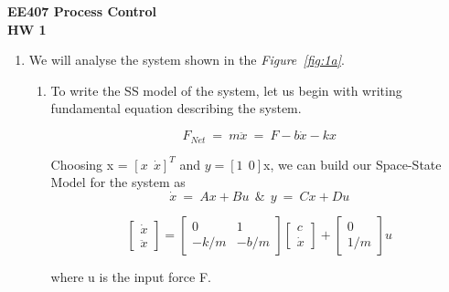 \documentclass[a4paper,12pt]{article}
\begin{document}
\begin{center}
	\textbf{\large EE407 Process Control \\[0.2cm] HW 1} \\
\end{center}

\begin{enumerate}
	\item We will analyse the system shown in the \textit{Figure~\ref{fig:1a}}. 

		\begin{enumerate}
			\item To write the SS model of the system, let us begin with writing fundamental equation describing the system.
			
			$$	F_{Net}~=~m\ddot{x}~=~F-b\dot{x}-kx	$$
			
			Choosing x = ${[x~~\dot{x}]}^T$ and $ y = [1~~0] $x, we can build our Space-State Model for the system as 
			$$ \dot{x}~=~Ax+Bu  ~~ \& ~~  y~=~Cx+Du			$$
			
			\[
			\begin{bmatrix}
   				\dot{x} \\
   			 	\ddot{x}
			\end{bmatrix}
			=
			\begin{bmatrix}
    			0 & 1 \\
    			-k/m & -b/m
			\end{bmatrix}			
			\begin{bmatrix}
   				c \\
   			 	\dot{x}
			\end{bmatrix}
			+
			\begin{bmatrix}
   				0 \\
   			 	1/m
			\end{bmatrix}
			u
			\]
			
			where u is the input force F.
			

\end{enumerate}
\end{enumerate}
\end{document}
